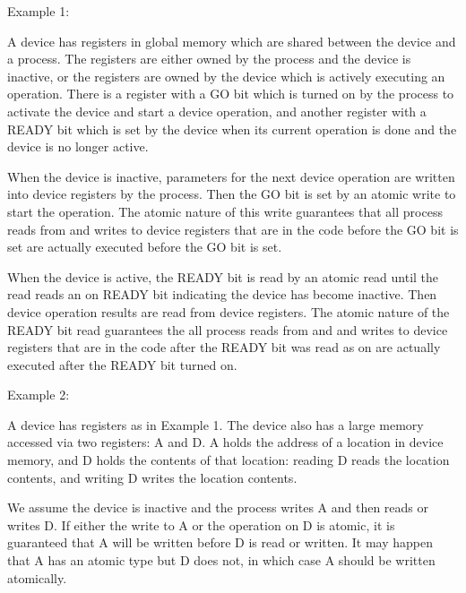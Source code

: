 \documentclass[12pt]{article}
\newenvironment{indpar}[1][0.3in]%
	{\begin{list}{}%
		     {\setlength{\itemsep}{0in}%
		      \setlength{\topsep}{0in}%
		      \setlength{\parsep}{1ex}%
		      \setlength{\labelwidth}{#1}%
		      \setlength{\leftmargin}{#1}%
		      \addtolength{\leftmargin}{\labelsep}}%
	 \item}%
	{\end{list}}
\begin{document}
Example 1:
\begin{indpar}
A device has registers in global memory which are shared between the
device and a process.  The registers are either owned by the process
and the device is inactive, or the registers are owned by the device
which is actively executing an operation.  There is a register with a GO bit
which is turned on by the process to activate the device and start a
device operation, and another
register with a READY bit which is set by the device when its current
operation is done and the device is no longer active.

When the device is inactive, parameters for the next device operation
are written into device registers by the process.  Then
the GO bit is set by an atomic write to start the operation.
The atomic nature of this write guarantees that all process reads from
and writes to device registers that are in the code before the GO bit
is set are actually executed before the GO bit is set.

When the device is active, the
READY bit is read by an atomic read until the read reads an on READY bit
indicating the device has become inactive.  Then device operation
results are read from device registers.  The atomic nature of the
READY bit read guarantees the all process reads from and
and writes to device registers that are in the code after the READY
bit was read as on are actually executed after the READY bit turned on.
\end{indpar}

Example 2:
\begin{indpar}
A device has registers as in Example 1.  The device also has a large
memory accessed via two registers: A and D.  A holds the address of
a location in device memory, and D holds the contents of that location:
reading D reads the location contents, and writing D writes the location
contents.

We assume the device is inactive and the process writes A and then
reads or writes D.  If either the write to A or the operation on D
is atomic, it is guaranteed that A will be written before D is read or
written.  It may happen that A has an atomic type but D does not,
in which case A should be written atomically.
\end{indpar}
\end{document}

